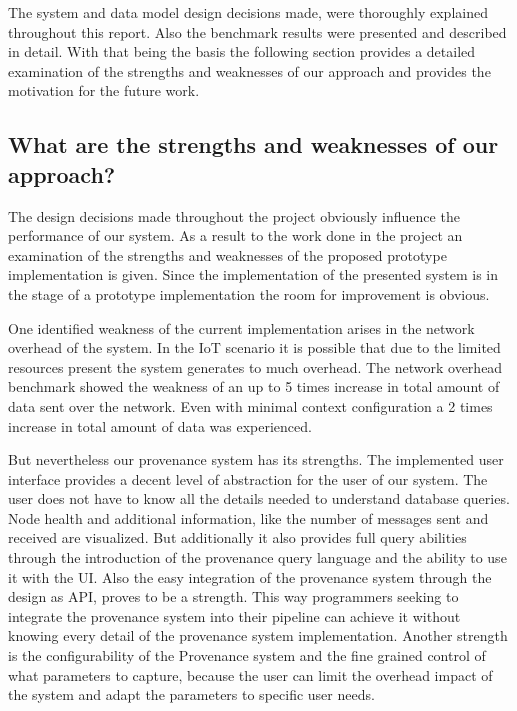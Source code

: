 The system and data model design decisions made, were thoroughly explained throughout this report. Also the benchmark results were presented and described in detail. With that being the basis the following section provides a detailed examination of the strengths and weaknesses of our approach and provides the motivation for the future work.
\subsection{What are the strengths and weaknesses of our approach?}
The design decisions made throughout the project obviously influence the performance of our system. As a result to the work done in the project an examination of the strengths and weaknesses of the proposed prototype implementation is given. 
Since the implementation of the presented system is in the stage of a prototype implementation the room for improvement is obvious.

One identified weakness of the current implementation arises in the network overhead of the system. In the IoT scenario it is possible that due to the limited resources present the system generates to much overhead. The network overhead benchmark showed the weakness of an up to 5 times increase in total amount of data sent over the network. Even with minimal context configuration a 2 times increase in total amount of data was experienced.

But nevertheless our provenance system has its strengths. 
The implemented user interface provides a decent level of abstraction for the user of our system. The user does not have to know all the details needed to understand database queries. Node health and additional information, like the number of messages sent and received are visualized. But additionally it also provides full query abilities through the introduction of the provenance query language and the ability to use it with the UI. Also the easy integration of the provenance system through the design as API, proves to be a strength. This way programmers seeking to integrate the provenance system into their pipeline can achieve it without knowing every detail of the provenance system implementation. Another strength is the configurability of the Provenance system and the fine grained control of what parameters to capture, because the user can limit the overhead impact of the system and adapt the parameters to specific user needs.




